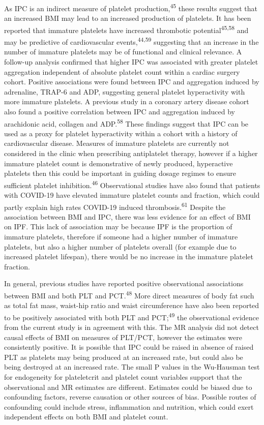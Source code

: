 \documentclass[11pt,twoside]{bristolthesis}
\begin{document}
As IPC is an indirect measure of platelet production,\textsuperscript{45} these results suggest that an increased BMI may lead to an increased production of platelets. It has been reported that immature platelets have increased thrombotic potential\textsuperscript{45,58} and may be predictive of cardiovascular events,\textsuperscript{44,59} suggesting that an increase in the number of immature platelets may be of functional and clinical relevance. A follow-up analysis confirmed that higher IPC was associated with greater platelet aggregation independent of absolute platelet count within a cardiac surgery cohort. Positive associations were found between IPC and aggregation induced by adrenaline, TRAP-6 and ADP, suggesting general platelet hyperactivity with more immature platelets. A previous study in a coronary artery disease cohort also found a positive correlation between IPC and aggregation induced by arachidonic acid, collagen and ADP.\textsuperscript{58} These findings suggest that IPC can be used as a proxy for platelet hyperactivity within a cohort with a history of cardiovascular disease. Measures of immature platelets are currently not considered in the clinic when prescribing antiplatelet therapy, however if a higher immature platelet count is demonstrative of newly produced, hyperactive platelets then this could be important in guiding dosage regimes to ensure sufficient platelet inhibition.\textsuperscript{46} Observational studies have also found that patients with COVID-19 have elevated immature platelet counts and fraction, which could partly explain high rates COVID-19 induced thrombosis.\textsuperscript{61} Despite the association between BMI and IPC, there was less evidence for an effect of BMI on IPF. This lack of association may be because IPF is the proportion of immature platelets, therefore if someone had a higher number of immature platelets, but also a higher number of platelets overall (for example due to increased platelet lifespan), there would be no increase in the immature platelet fraction.

In general, previous studies have reported positive observational associations between BMI and both PLT and PCT.\textsuperscript{48} More direct measures of body fat such as total fat mass, waist-hip ratio and waist circumference have also been reported to be positively associated with both PLT and PCT;\textsuperscript{49} the observational evidence from the current study is in agreement with this. The MR analysis did not detect causal effects of BMI on measures of PLT/PCT, however the estimates were consistently positive. It is possible that IPC could be raised in absence of raised PLT as platelets may being produced at an increased rate, but could also be being destroyed at an increased rate. The small P values in the Wu-Hausman test for endogeneity for plateletcrit and platelet count variables support that the observational and MR estimates are different. Estimates could be biased due to confounding factors, reverse causation or other sources of bias. Possible routes of confounding could include stress, inflammation and nutrition, which could exert independent effects on both BMI and platelet count.
\end{document}
